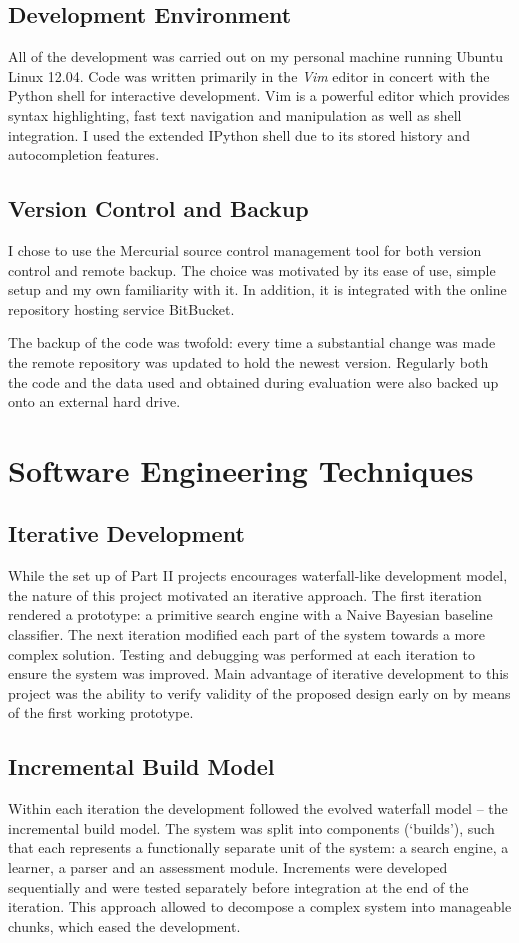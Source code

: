 \documentclass[12pt,notitlepage,twoside]{scrreprt}
\begin{document}
\subsection{Development Environment}
All of the development was carried out on my personal machine running Ubuntu Linux 12.04.
Code was written primarily in the \textit{Vim} editor in concert with the Python shell for
interactive development. Vim is a powerful editor which provides syntax highlighting, fast
text navigation and manipulation as well as shell integration. I used the extended IPython
shell due to its stored history and autocompletion features.

\subsection{Version Control and Backup}
I chose to use the Mercurial source control management tool for both version control and
remote backup. The choice was motivated by its ease of use, simple setup and my own
familiarity with it. In addition, it is integrated with the online repository hosting
service BitBucket. 

The backup of the code was twofold: every time a substantial change
was made the remote repository was updated to hold the newest version. Regularly both the
code and the data used and obtained during evaluation were also backed up onto an external
hard drive.

\section{Software Engineering Techniques}
\subsection{Iterative Development}
While the set up of Part II projects encourages waterfall-like development model, the
nature of this project motivated an iterative approach. The first iteration rendered a
prototype: a primitive search engine with a Naive Bayesian baseline classifier.  The next
iteration modified each part of the system towards a more complex solution. Testing and
debugging was performed at each iteration to ensure the system was improved. Main
advantage of iterative development to this project was the ability to verify validity of
the proposed design early on by means of the first working prototype.
\subsection{Incremental Build Model}
Within each  iteration the development followed the evolved waterfall model -- the
incremental build model. The system was split into components (`builds'), such that each
represents a functionally separate unit of the system: a search engine, a learner, a
parser and an assessment module. Increments were developed sequentially and were tested
separately before integration at the end of the iteration. This approach allowed to
decompose a complex system into manageable chunks, which eased the development.
\end{document}
